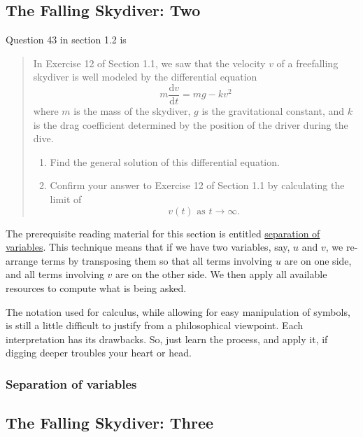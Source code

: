 \documentclass[
  a4paper,
]{article}
\begin{document}
\subsection{The Falling Skydiver: Two}\label{the-falling-skydiver-two}

Question 43 in section 1.2 is

\begin{quote}
In Exercise 12 of Section 1.1, we saw that the velocity \(v\) of a
freefalling skydiver is well modeled by the differential equation \[
m\frac{\mathrm{d}v}{\mathrm{d}t} = mg - kv^2
\] where \(m\) is the mass of the skydiver, \(g\) is the gravitational
constant, and \(k\) is the drag coefficient determined by the position
of the driver during the dive.

\begin{enumerate}
\def\labelenumi{(\alph{enumi})}
\item
  Find the general solution of this differential equation.
\item
  Confirm your answer to Exercise 12 of Section 1.1 by calculating the
  limit of \[
  v(t) \text{ as } t\to\infty.
  \]
\end{enumerate}
\end{quote}

The prerequisite reading material for this section is entitled
\href{https://en.wikipedia.org/wiki/Separation_of_variables}{separation
of variables}. This technique means that if we have two variables, say,
\(u\) and \(v\), we re-arrange terms by transposing them so that all
terms involving \(u\) are on one side, and all terms involving \(v\) are
on the other side. We then apply all available resources to compute what
is being asked.

The notation used for calculus, while allowing for easy manipulation of
symbols, is still a little difficult to justify from a philosophical
viewpoint. Each interpretation has its drawbacks. So, just learn the
process, and apply it, if digging deeper troubles your heart or head.

\subsubsection{Separation of variables}\label{separation-of-variables}

\subsection{The Falling Skydiver:
Three}\label{the-falling-skydiver-three}
\end{document}
